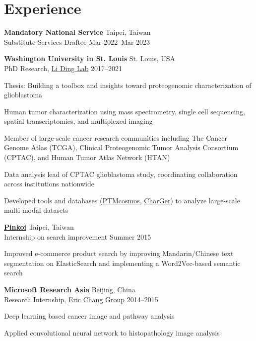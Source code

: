 \section{Experience}
\begin{entrylist}

\item \textbf{Mandatory National Service} \hfill Taipei, Taiwan\\
Substitute Services Draftee \hfill
Mar 2022--Mar 2023

\item \textbf{Washington University in St. Louis} \hfill St. Louis, USA\\
PhD Research, \href{https://dinglab.wustl.edu/}{Li Ding Lab} \hfill
2017--2021
\begin{detaillist}
    \item Thesis: Building a toolbox and insights toward proteogenomic characterization of glioblastoma
    \item Human tumor characterization using mass spectrometry, single cell sequencing, spatial transcriptomics, and multiplexed imaging
    \item Member of large-scale cancer research communities including The Cancer Genome Atlas (TCGA), Clinical Proteogenomic Tumor Analysis Consortium (CPTAC), and Human Tumor Atlas Network (HTAN)
    \item Data analysis lead of CPTAC glioblastoma study, coordinating collaboration across institutions nationwide
    \item Developed tools and databases (\href{https://ptmcosmos.wustl.edu/}{PTMcosmos}, \href{https://github.com/ding-lab/CharGer}{CharGer}) to analyze large-scale multi-modal datasets
\end{detaillist}

\item \href{http://pinkoi.com}{\textbf{Pinkoi}} \hfill Taipei, Taiwan\\
Internship on search improvement \hfill
Summer 2015
\begin{detaillist}
    \item Improved e-commerce product search by improving Mandarin/Chinese text segmentation on ElasticSearch and implementing a Word2Vec-based semantic search
\end{detaillist}

\item \textbf{Microsoft Research Asia} \hfill Beijing, China\\
Research Internship, \href{https://www.microsoft.com/en-us/research/people/echang/}{Eric Chang Group} \hfill
2014--2015
\begin{detaillist}
    \item Deep learning based cancer image and pathway analysis
    \item Applied convolutional neural network to histopathology image analysis
\end{detaillist}


\end{entrylist}
